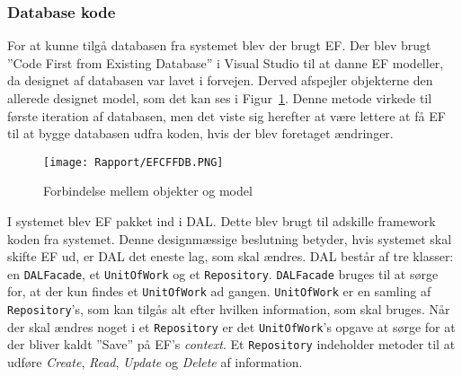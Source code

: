 \subsubsection{Database kode}
For at kunne tilgå databasen fra systemet blev der brugt \gls{EF}. 
Der blev brugt ''Code First from Existing Database'' i Visual Studio til at danne \gls{EF} modeller, da designet af databasen var lavet i forvejen. Derved afspejler objekterne den allerede designet model, som det kan ses i Figur~\ref{fig:CodeFirstFromDB}. Denne metode virkede til første iteration af databasen, men det viste sig herefter at være lettere at få \gls{EF} til at bygge databasen udfra koden, hvis der blev foretaget ændringer.

\begin{figure}[H]
    \centering
	\texttt{[image: Rapport/EFCFFDB.PNG]}
	\caption{Forbindelse mellem objekter og model}
	\label{fig:CodeFirstFromDB}
\end{figure} 

I systemet blev \gls{EF} pakket ind i \gls{DAL}. Dette blev brugt til adskille framework koden fra systemet. Denne designmæssige beslutning betyder, hvis systemet skal skifte \gls{EF} ud, er \gls{DAL} det eneste lag, som skal ændres.
\newline\newline
\gls{DAL} består af tre klasser: en \texttt{DALFacade}, et \texttt{UnitOfWork} og et \texttt{Repository}. 
\texttt{DALFacade} bruges til at sørge for, at der kun findes et \texttt{UnitOfWork} ad gangen.
\texttt{UnitOfWork} er en samling af \texttt{Repository}'s, som kan tilgås alt efter hvilken information, som skal bruges. Når der skal ændres noget i et \texttt{Repository} er det \texttt{UnitOfWork}'s opgave at sørge for at der bliver kaldt ''Save'' på \gls{EF}'s \textit{context}.
Et \texttt{Repository} indeholder metoder til at udføre \textit{Create}, \textit{Read}, \textit{Update} og \textit{Delete} af information.
